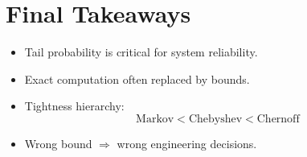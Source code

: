 \documentclass{article}
\begin{document}
\section*{Final Takeaways}

\begin{itemize}
    \item Tail probability is critical for system reliability.
    \item Exact computation often replaced by bounds.
    \item Tightness hierarchy:
    \[\text{Markov} < \text{Chebyshev} < \text{Chernoff}\]
    \item Wrong bound $\Rightarrow$ wrong engineering decisions.
\end{itemize}
\end{document}

